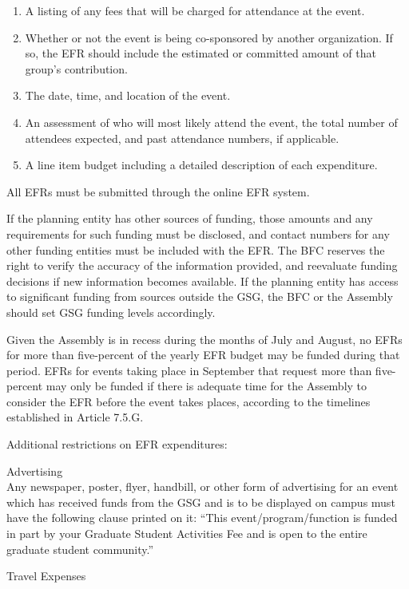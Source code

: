 \begin{bylaws-number}
\begin{bylaws-number}
\begin{enumerate}[i]
  \item A listing of any fees that will be charged for attendance at the event.
  \item Whether or not the event is being co-sponsored by another organization. If so, the EFR should include the estimated or committed amount of that group’s contribution.
  \item The date, time, and location of the event.
  \item An assessment of who will most likely attend the event, the total number of attendees expected, and past attendance numbers, if applicable.
  \item A line item budget including a detailed description of each expenditure.
\end{enumerate}
  \item All EFRs must be submitted through the online EFR system.
  \item If the planning entity has other sources of funding, those amounts and any requirements for such funding must be disclosed, and contact numbers for any other funding entities must be included with the EFR. The BFC reserves the right to verify the accuracy of the information provided, and reevaluate funding decisions if new information becomes available. If the planning entity has access to significant funding from sources outside the GSG, the BFC or the Assembly should set GSG funding levels accordingly.
  \item Given the Assembly is in recess during the months of July and August, no EFRs for more than five-percent of the yearly EFR budget may be funded during that period. EFRs for events taking place in September that request more than five-percent may only be funded if there is adequate time for the Assembly to consider the EFR before the event takes places, according to the timelines established in Article 7.5.G.
\end{bylaws-number}
  \item Additional restrictions on EFR expenditures:
\begin{bylaws-number}
  \item Advertising \hfill \\
Any newspaper, poster, flyer, handbill, or other form of advertising for an event which has received funds from the GSG and is to be displayed on campus must have the following clause printed on it: “This event/program/function is funded in part by your Graduate Student Activities Fee and is open to the entire graduate student community.”
  \item Travel Expenses \hfill \\

\end{bylaws-number}
\end{bylaws-number}
